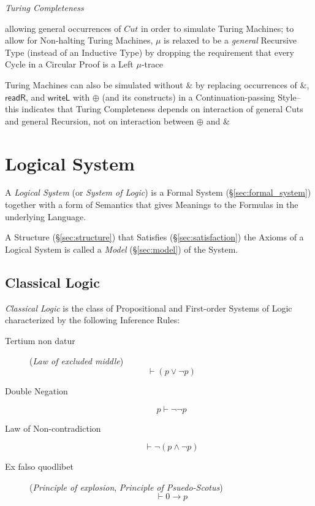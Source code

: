 \emph{Turing Completeness}

allowing general occurrences of $Cut$ in order to simulate Turing Machines; to
allow for Non-halting Turing Machines, $\mu$ is relaxed to be a \emph{general}
Recursive Type (instead of an Inductive Type) by dropping the requirement that
every Cycle in a Circular Proof is a Left $\mu$-trace

Turing Machines can also be simulated without $\&$ by replacing occurrences of
$\&$, $\mathsf{readR}$, and $\mathsf{writeL}$ with $\oplus$ (and its constructs)
in a Continuation-passing Style-- this indicates that Turing Completeness
depends on interaction of general Cuts and general Recursion, not on interaction
between $\oplus$ and $\&$



\section{Logical System}\label{sec:logical_system}

A \emph{Logical System} (or \emph{System of Logic}) is a Formal System
(\S\ref{sec:formal_system}) together with a form of Semantics that
gives Meanings to the Formulas in the underlying Language.

A Structure (\S\ref{sec:structure}) that Satisfies
(\S\ref{sec:satisfaction}) the Axioms of a Logical System is called a
\emph{Model} (\S\ref{sec:model}) of the System.



\subsection{Classical Logic}\label{sec:classical_logic}

\emph{Classical Logic} is the class of Propositional and
First-order Systems of Logic characterized by the following Inference
Rules:

\begin{description}

\item [Tertium non datur] (\emph{Law of excluded middle})
  \[
    \vdash(p \vee \neg p)
  \]

\item [Double Negation]
  \[
    p \vdash \neg\neg p
  \]

\item [Law of Non-contradiction]
  \[
    \vdash \neg(p \wedge \neg p)
  \]

\item [Ex falso quodlibet] (\emph{Principle of explosion},
  \emph{Principle of Psuedo-Scotus})
  \[
    \vdash 0 \rightarrow p
  \]


\end{description}

